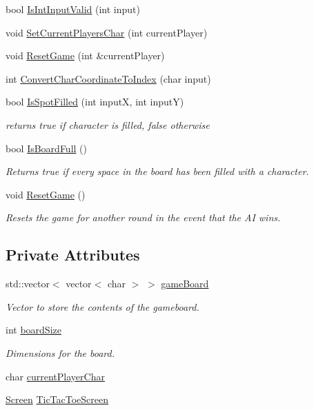 \begin{DoxyCompactItemize}
\item 
bool \hyperlink{classTicTacToe_ab2b2442eaad32fe7bd57db13ca5db77f}{Is\-Int\-Input\-Valid} (int input)
\item 
void \hyperlink{classTicTacToe_a3c05c5ac2c16a02a6a3c3b2021fdde74}{Set\-Current\-Players\-Char} (int current\-Player)
\item 
void \hyperlink{classTicTacToe_a740fc2c6b0526442ead17835c473f93e}{Reset\-Game} (int \&current\-Player)
\item 
int \hyperlink{classTicTacToe_a40ab96fced3061640200f5e7b83e0415}{Convert\-Char\-Coordinate\-To\-Index} (char input)
\item 
bool \hyperlink{classTicTacToe_a7b1ba09a855c9a3f71e3e06b3e76a992}{Is\-Spot\-Filled} (int input\-X, int input\-Y)
\begin{DoxyCompactList}\small\item\em returns true if character is filled, false otherwise \end{DoxyCompactList}\item 
bool \hyperlink{classTicTacToe_a7bb5521e85c2a1d4c61ab405d03a62c5}{Is\-Board\-Full} ()
\begin{DoxyCompactList}\small\item\em Returns true if every space in the board has been filled with a character. \end{DoxyCompactList}\item 
void \hyperlink{classTicTacToe_a36b58f33246558d0b7b34412b641cff6}{Reset\-Game} ()
\begin{DoxyCompactList}\small\item\em Resets the game for another round in the event that the A\-I wins. \end{DoxyCompactList}\end{DoxyCompactItemize}
\subsection*{Private Attributes}
\begin{DoxyCompactItemize}
\item 
std\-::vector$<$ vector$<$ char $>$ $>$ \hyperlink{classTicTacToe_a56cd1b3760908be79d5fa311c2d17761}{game\-Board}
\begin{DoxyCompactList}\small\item\em Vector to store the contents of the gameboard. \end{DoxyCompactList}\item 
int \hyperlink{classTicTacToe_a0aab68285cb8b8f5ce6159ed5cfc8bbd}{board\-Size}
\begin{DoxyCompactList}\small\item\em Dimensions for the board. \end{DoxyCompactList}\item 
char \hyperlink{classTicTacToe_a914627e3dd8100c387e98c4a022b1457}{current\-Player\-Char}
\item 
\hyperlink{classScreen}{Screen} \hyperlink{classTicTacToe_a6749582a8480be3cbae920f8f2cca8ce}{Tic\-Tac\-Toe\-Screen}
\end{DoxyCompactItemize}
